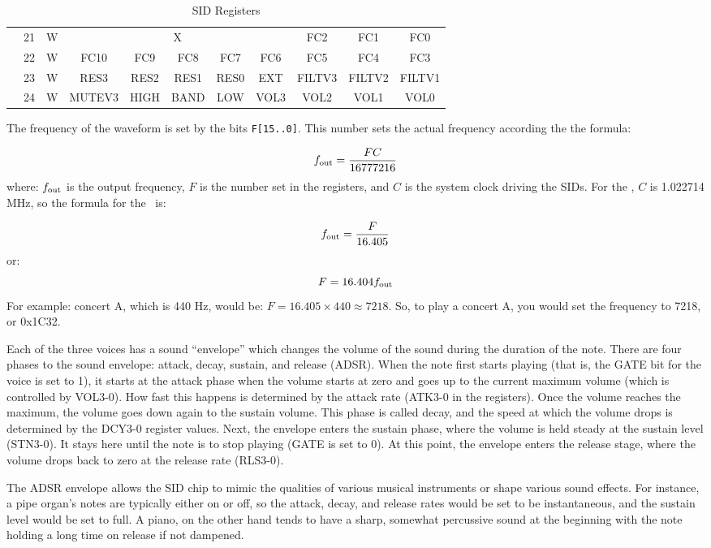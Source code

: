 \begin{table}[ht]
\begin{center}
\begin{tabular}{|c|c|c|c|c|c|c|c|c|c|c|}
            \multirow{4}{*}{} & 21 & W & \multicolumn{5}{|c|}{X} & FC2 & FC1 & FC0 \\ \cline{2-11}
            & 22 & W & FC10 & FC9 & FC8 & FC7 & FC6 & FC5 & FC4 & FC3 \\ \cline{2-11}
            & 23 & W & RES3 & RES2 & RES1 & RES0 & EXT & FILTV3 & FILTV2 & FILTV1 \\ \cline{2-11}
            & 24 & W & MUTEV3 & HIGH & BAND & LOW & VOL3 & VOL2 & VOL1 & VOL0 \\ \hline
		\end{tabular}
	\end{center}
	\caption{SID Registers}
	\label{tab:sid_registers}
\end{table}

The frequency of the waveform is set by the bits \verb+F[15..0]+. This number sets the actual frequency according the the formula:

\[
f_{\rm out} = \frac{FC}{16777216}
\]
where: $f_{\rm out}$ is the output frequency, $F$ is the number set in the registers, and $C$ is the system clock driving the SIDs. For the \jr, $C$ is 1.022714 MHz, so the formula for the \jr\ is:

\[
f_{\rm out} = \frac{F}{16.405}
\]
or:
\[
F = 16.404f_{\rm out}
\]
For example: concert A, which is 440 Hz, would be: $F = 16.405 \times 440 \approx 7218$. So, to play a concert A, you would set the frequency to 7218, or 0x1C32.

Each of the three voices has a sound ``envelope'' which changes the volume of the sound during the duration of the note. There are four phases to the sound envelope: attack, decay, sustain, and release (ADSR). When the note first starts playing (that is, the GATE bit for the voice is set to 1), it starts at the attack phase when the volume starts at zero and goes up to the current maximum volume (which is controlled by VOL3-0). How fast this happens is determined by the attack rate (ATK3-0 in the registers). Once the volume reaches the maximum, the volume goes down again to the sustain volume. This phase is called decay, and the speed at which the volume drops is determined by the DCY3-0 register values. Next, the envelope enters the sustain phase, where the volume is held steady at the sustain level (STN3-0). It stays here until the note is to stop playing (GATE is set to 0). At this point, the envelope enters the release stage, where the volume drops back to zero at the release rate (RLS3-0).

The ADSR envelope allows the SID chip to mimic the qualities of various musical instruments or shape various sound effects. For instance, a pipe organ's notes are typically either on or off, so the attack, decay, and release rates would be set to be instantaneous, and the sustain level would be set to full. A piano, on the other hand tends to have a sharp, somewhat percussive sound at the beginning with the note holding a long time on release if not dampened.

